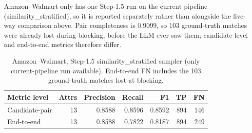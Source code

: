 \documentclass[11pt]{article}
\begin{document}
\begin{table}[htbp]
\centering
\small
{}
\caption{Fodors--Zagat (\texttt{class} excluded), Step-1.5 profile samplers over six
runs each. End-to-end metrics; blocking pair completeness is 1.0000 throughout, and
blocking is held fixed across seeds so that only the profiling sample varies.}
\label{tab:fodors-seeds}
\end{table}

Amazon--Walmart only has one Step-1.5 run on the current pipeline
(similarity\_stratified), so it is reported separately rather than alongside the
five-way comparison above. Pair completeness is 0.9099, so 103 ground-truth matches
were already lost during blocking, before the LLM ever saw them; candidate-level and
end-to-end metrics therefore differ.

\begin{table}[htbp]
\centering
\small
\begin{tabular}{lrrrrrr}
\toprule
Metric level & Attrs & Precision & Recall & F1 & TP & FN \\
\midrule
Candidate-pair & 13 & 0.8588 & 0.8596 & 0.8592 & 894 & 146 \\
End-to-end     & 13 & 0.8588 & 0.7822 & 0.8187 & 894 & 249 \\
\bottomrule
\end{tabular}
\caption{Amazon--Walmart, Step-1.5 similarity\_stratified sampler (only current-pipeline run available). End-to-end FN includes the 103 ground-truth matches lost at blocking.}
\label{tab:amazon-results}
\end{table}
\end{document}
